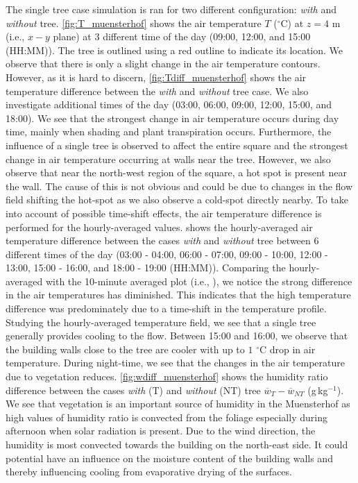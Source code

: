 The single tree case simulation is ran for two different configuration: \textit{with} and \textit{without} tree. \cref{fig:T_muensterhof} shows the air temperature $T$ ($^{\circ}$C) at $z=4$ m (i.e., $x-y$ plane) at 3 different time of the day (09:00, 12:00, and 15:00 (HH:MM)). The tree is outlined using a red outline to indicate its location. We observe that there is only a slight change in the air temperature contours. However, as it is hard to discern, \cref{fig:Tdiff_muensterhof} shows the air temperature difference between the \textit{with} and \textit{without} tree case. We also investigate additional times of the day (03:00, 06:00, 09:00, 12:00, 15:00, and 18:00). We see that the strongest change in air temperature occurs during day time, mainly when shading and plant transpiration occurs. Furthermore, the influence of a single tree is observed to affect the entire square and the strongest change in air temperature occurring at walls near the tree. However, we also observe that near the north-west region of the square, a hot spot is present near the wall. The cause of this is not obvious and could be due to changes in the flow field shifting the hot-spot as we also observe a cold-spot directly nearby. To take into account of possible time-shift effects, the air temperature difference is performed for the hourly-averaged values.  shows the hourly-averaged air temperature difference between the cases \textit{with} and \textit{without} tree between 6 different times of the day (03:00 - 04:00, 06:00 - 07:00, 09:00 - 10:00, 12:00 - 13:00, 15:00 - 16:00, and 18:00 - 19:00 (HH:MM)). Comparing the hourly-averaged with the 10-minute averaged plot (i.e., ), we notice the strong difference in the air temperatures has diminished. This indicates that the high temperature difference was predominately due to a time-shift in the temperature profile. Studying the hourly-averaged temperature field, we see that a single tree generally provides cooling to the flow. Between 15:00 and 16:00, we observe that the building walls close to the tree are cooler with up to $1$ $^{\circ}$C drop in air temperature. During night-time, we see that the changes in the air temperature due to vegetation reduces. \cref{fig:wdiff_muensterhof} shows the humidity ratio difference between the cases \textit{with} (T) and \textit{without} (NT) tree $\overline{w}_{T}-\overline{w}_{\textit{NT}}$ (g\,kg$^{-1}$). We see that vegetation is an important source of humidity in the Muensterhof as high values of humidity ratio is convected from the foliage especially during afternoon when solar radiation is present. Due to the wind direction, the humidity is most convected towards the building on the north-east side. It could potential have an influence on the moisture content of the building walls and thereby influencing cooling from evaporative drying of the surfaces. 

